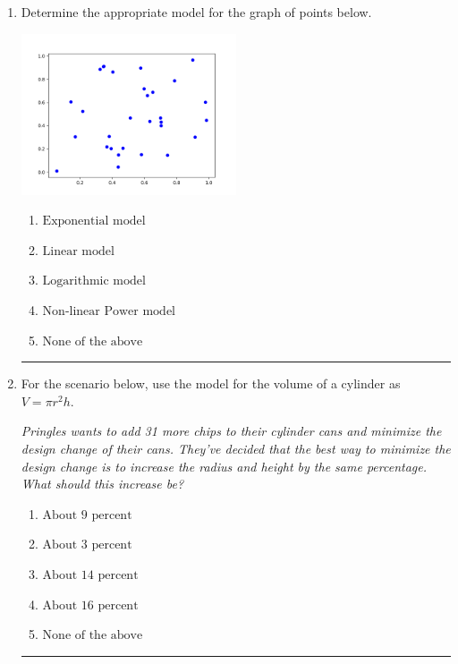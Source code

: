 \documentclass[14pt]{extbook}
\newcommand{\litem}[1]{\item#1\hspace*{-1cm}\rule{\textwidth}{0.4pt}}
\begin{document}
\begin{enumerate}
{\begin{enumerate}[label=\Alph*.]
\end{enumerate} }
\litem{
Determine the appropriate model for the graph of points below.
\begin{center}
    \includegraphics[width=0.5\textwidth]{../Figures/identifyModelGraph12B.png}
\end{center}
\begin{enumerate}[label=\Alph*.]
\item \( \text{Exponential model} \)
\item \( \text{Linear model} \)
\item \( \text{Logarithmic model} \)
\item \( \text{Non-linear Power model} \)
\item \( \text{None of the above} \)

\end{enumerate} }
\litem{
For the scenario below, use the model for the volume of a cylinder as $V = \pi r^2 h$.
\begin{center}
    \textit{ Pringles wants to add 31 \text{percent} more chips to their cylinder cans and minimize the design change of their cans. They've decided that the best way to minimize the design change is to increase the radius and height by the same percentage. What should this increase be? }
\end{center}
\begin{enumerate}[label=\Alph*.]
\item \( \text{About } 9 \text{ percent} \)
\item \( \text{About } 3 \text{ percent} \)
\item \( \text{About } 14 \text{ percent} \)
\item \( \text{About } 16 \text{ percent} \)
\item \( \text{None of the above} \)


\end{enumerate}}
\end{enumerate}
\end{document}
